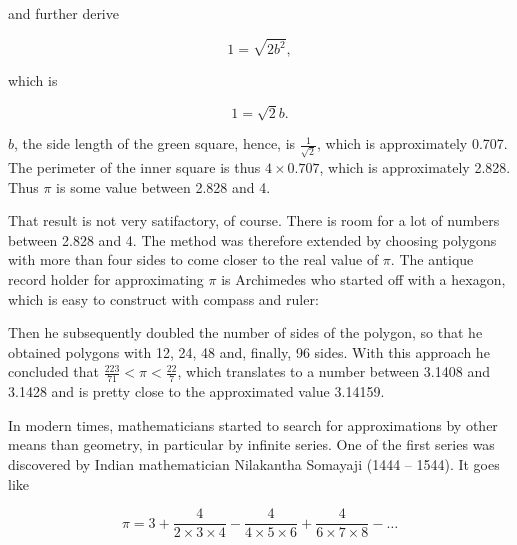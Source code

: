 \documentclass[tikz]{scrreprt}
\begin{document}
and further derive

\begin{equation}
1 = \sqrt{2b^2},
\end{equation}

which is

\begin{equation}
1 = \sqrt{2}b.
\end{equation}

$b$, the side length of the green square,
hence, is $\frac{1}{\sqrt{2}}$, which is
approximately 0.707. The perimeter of
the inner square is thus $4 \times 0.707$,
which is approximately 2.828.
Thus $\pi$ is some value between 2.828 and 4.

That result is not very satifactory, of course.
There is room for a lot of numbers between
2.828 and 4. The method was therefore extended
by choosing polygons with more than four sides
to come closer to the real value of $\pi$.
The antique record holder for approximating $\pi$
is Archimedes who started off with a hexagon,
which is easy to construct with compass and ruler:

\begin{center}
\end{center}

Then he subsequently doubled the number of sides
of the polygon, so that he obtained polygons with
12, 24, 48 and, finally, 96 sides. With this approach
he concluded that $\frac{223}{71} < \pi < \frac{22}{7}$,
which translates to a number between 3.1408 and 3.1428
and is pretty close to the approximated value 3.14159.

In modern times, mathematicians started to search
for approximations by other means than geometry,
in particular by infinite series. One of the first series
was discovered by Indian mathematician Nilakantha Somayaji
(1444 -- 1544). It goes like

\begin{equation}
  \pi = 3 + \frac{4}{2\times 3 \times 4} -
            \frac{4}{4\times 5 \times 6} +
            \frac{4}{6\times 7 \times 8} -
            \dots
\end{equation}
\end{document}
